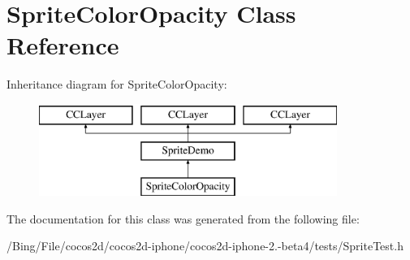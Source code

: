 \hypertarget{interface_sprite_color_opacity}{\section{Sprite\-Color\-Opacity Class Reference}
\label{interface_sprite_color_opacity}
}
Inheritance diagram for Sprite\-Color\-Opacity\-:\begin{figure}[H]
\begin{center}
\leavevmode
\includegraphics[height=3.000000cm]{interface_sprite_color_opacity}
\end{center}
\end{figure}


The documentation for this class was generated from the following file\-:\begin{DoxyCompactItemize}
\item 
/\-Bing/\-File/cocos2d/cocos2d-\/iphone/cocos2d-\/iphone-\/2.-\/beta4/tests/Sprite\-Test.\-h\end{DoxyCompactItemize}
